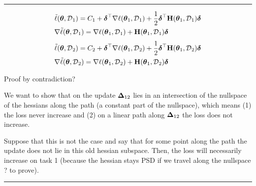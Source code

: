 \documentclass{article} %
\newcommand{\hessian}{\vH}
\newcommand{\lighthline}{\noindent\textcolor{gray!50}{\rule{\linewidth}{0.4pt}}}
\begin{document}
\vspace{0.3cm}
\lighthline
\begin{align}
\label{eq:v3}
        &\tilde{\loss}(\vparam, \data_{1}) =  C_1 + \vdelta^\top{\nabla\loss}(\vparam_1, \data_{1}) + \frac{1}{2}\vdelta^\top\hessian(\vparam_1, \data_{1})\vdelta \\
        &\nabla\tilde{\loss}(\vparam, \data_{1}) =  {\nabla\loss}(\vparam_1, \data_{1}) + \hessian(\vparam_1, \data_{1})\vdelta 
\end{align}
\begin{align}
\label{eq:v4}
        &\tilde{\loss}(\vparam, \data_{2}) =  C_2 + \vdelta^\top{\nabla\loss}(\vparam_1, \data_{2}) + \frac{1}{2}\vdelta^\top\hessian(\vparam_1, \data_{2})\vdelta \\
        &\nabla\tilde{\loss}(\vparam, \data_{2}) =  {\nabla\loss}(\vparam_1, \data_{2}) + \hessian(\vparam_1, \data_{2})\vdelta  
\end{align}

Proof by contradiction? 

We want to show that on the update $\mbox{$\mbox{$\boldsymbol{\Delta}$}$}_{12}$ lies in an intersection of the nullspace of the hessians along the path (a constant part of the nullspace), which means (1) the loss never increase and (2) on a linear path along $\mbox{$\mbox{$\boldsymbol{\Delta}$}$}_{12}$ the loss does not increase. 

Suppose that this is not the case and say that for some point along the path the update does not lie in this old hessian subspace. Then, the loss will necessarily increase on task 1 (because the hessian stays PSD if we travel along the nullspace ? to prove). 

\lighthline
\end{document}
